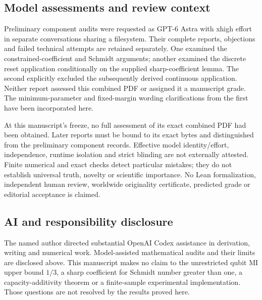 \documentclass[11pt]{article}
\begin{document}
\subsection*{Model assessments and review context}
Preliminary component audits were requested as GPT-6 Astra with xhigh effort in separate conversations sharing a filesystem. Their complete reports, objections and failed technical attempts are retained separately. One examined the constrained-coefficient and Schmidt arguments; another examined the discrete reset application conditionally on the supplied sharp-coefficient lemma. The second explicitly excluded the subsequently derived continuous application. Neither report assessed this combined PDF or assigned it a manuscript grade. The minimum-parameter and fixed-margin wording clarifications from the first have been incorporated here.

At this manuscript's freeze, no full assessment of its exact combined PDF had been obtained. Later reports must be bound to its exact bytes and distinguished from the preliminary component records. Effective model identity/effort, independence, runtime isolation and strict blinding are not externally attested. Finite numerical and exact checks detect particular mistakes; they do not establish universal truth, novelty or scientific importance. No Lean formalization, independent human review, worldwide originality certificate, predicted grade or editorial acceptance is claimed.

\subsection*{AI and responsibility disclosure}
The named author directed substantial OpenAI Codex assistance in derivation, writing and numerical work. Model-assisted mathematical audits and their limits are disclosed above. This manuscript makes no claim to the unrestricted qubit MI upper bound $1/3$, a sharp coefficient for Schmidt number greater than one, a capacity-additivity theorem or a finite-sample experimental implementation. Those questions are not resolved by the results proved here.
\end{document}
